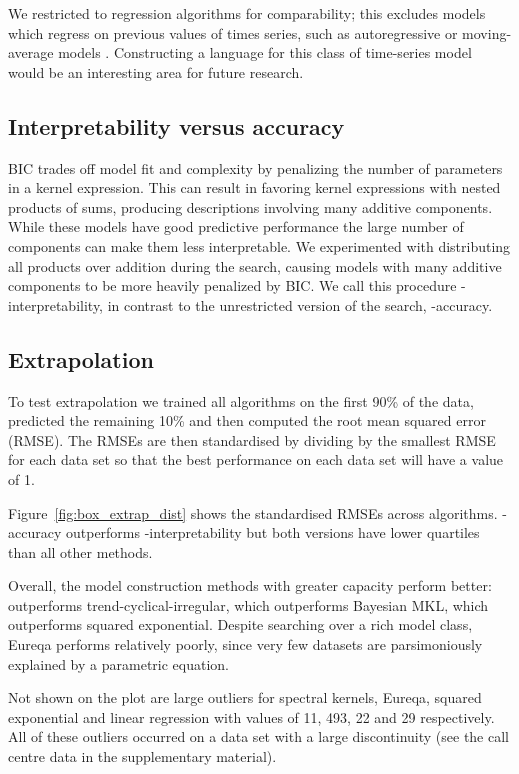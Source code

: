 We restricted to regression algorithms for comparability; this excludes models which regress on previous values of times series, such as autoregressive or moving-average models \citep[e.g.][]{box2013time}.
Constructing a language for this class of time-series model would be an interesting area for future research.

\subsection{Interpretability versus accuracy}

BIC trades off model fit and complexity by penalizing the number of parameters in a kernel expression.
This can result in \procedurename{} favoring kernel expressions with nested products of sums, producing descriptions involving many additive components.
While these models have good predictive performance the large number of components can make them less interpretable.
We experimented with distributing all products over addition during the search, causing models with many additive components to be more heavily penalized by BIC.
We call this procedure \procedurename{}-interpretability, in contrast to the unrestricted version of the search, \procedurename{}-accuracy.

\subsection{Extrapolation}

To test extrapolation we trained all algorithms on the first 90\% of the data, predicted the remaining 10\% and then computed the root mean squared error (RMSE).
The RMSEs are then standardised by dividing by the smallest RMSE for each data set so that the best performance on each data set will have a value of 1.

Figure~\ref{fig:box_extrap_dist} shows the standardised RMSEs across algorithms.
\procedurename{}-accuracy outperforms \procedurename{}-interpretability but both versions have lower quartiles than all other methods.

Overall, the model construction methods with greater capacity perform better: \procedurename{} outperforms trend-cyclical-irregular, which outperforms Bayesian MKL, which outperforms squared exponential.
Despite searching over a rich model class, Eureqa performs relatively poorly, since very few datasets are parsimoniously explained by a parametric equation.

Not shown on the plot are large outliers for spectral kernels, Eureqa, squared exponential and linear regression with values of 11, 493, 22 and 29 respectively.
All of these outliers occurred on a data set with a large discontinuity (see the call centre data in the supplementary material).

